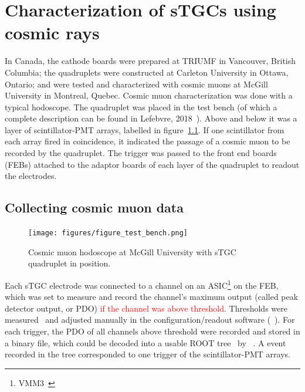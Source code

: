 
\chapter{Characterization of sTGCs using cosmic rays}
\label{chap:cosmics}

In Canada, the cathode boards were prepared at TRIUMF in Vancouver, British Columbia; the quadruplets were constructed at Carleton University in Ottawa, Ontario; and were tested and characterized with cosmic muons at McGill University in Montreal, Quebec. Cosmic muon characterization was done with a typical hodoscope.  The quadruplet was placed in the test bench (of which a complete description can be found in Lefebvre, 2018~\cite{lefebvre_thesis}). Above and below it was a layer of scintillator-PMT arrays, labelled in figure~\ref{fig:hodoscope}. If one scintillator from each array fired in coincidence, it indicated the passage of a cosmic muon to be recorded by the quadruplet. The trigger was passed to the front end boards (FEBs) attached to the adaptor boards of each layer of the quadruplet to readout the electrodes.

\section{Collecting cosmic muon data}
\begin{figure}
    \centering
    \texttt{[image: figures/figure\_test\_bench.png]}
    \caption{Cosmic muon hodoscope at McGill University with sTGC quadruplet in position.}
    \label{fig:hodoscope}
\end{figure}

Each sTGC electrode was connected to a channel on an ASIC\footnote{VMM3~\cite{iakovidis_vmm3_2017}} on the FEB, which was set to measure and record the channel's maximum output (called peak detector output, or PDO) \textcolor{red}{if the channel was above threshold}. Thresholds were measured~\cite{chen_calibration_2019} and adjusted manually in the configuration/readout software (~\cite{siyuan_sun_stgc_readout_sw}). For each trigger, the PDO of all channels above threshold were recorded and stored in a binary file, which could be decoded into a usable ROOT tree~\cite{ROOT} by ~\cite{lefebvre_tgc_analysis}. A event recorded in the tree corresponded to one trigger of the scintillator-PMT arrays. 

